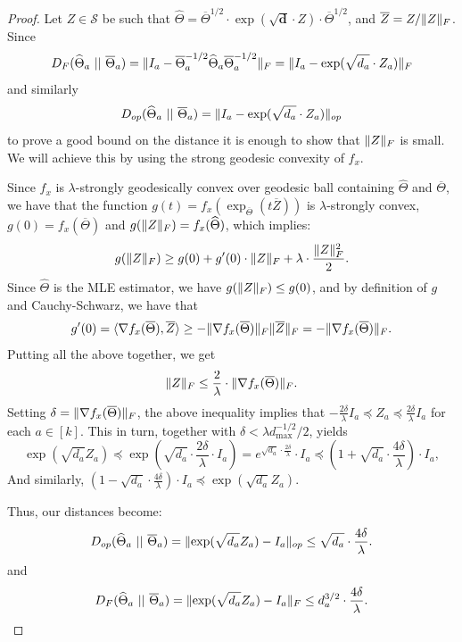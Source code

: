 \documentclass[aos]{imsart}
\theoremstyle{definition}
\numberwithin{equation}{section}
\DeclarePairedDelimiter{\norm}{\lVert}{\rVert}
\newcommand{\otheta}{\overline{\Theta}}
\newcommand{\htheta}{\widehat{\Theta}}
\newcommand{\oZ}{\overline{Z}}
\renewcommand{\vec}{\bm}
\newcommand{\Sym}{\mathcal{S}}
\def\dmax{d_{\max}}
\begin{document}
\begin{proof}
	Let $Z \in \Sym$ be such that $\htheta = \otheta^{1/2} \cdot \exp(\sqrt{\vec d} \cdot Z) \cdot \otheta^{1/2}$, and $\oZ = Z / \norm{Z}_F$.
	Since
	$$ D_F(\htheta_a \ || \ \otheta_a) = \norm{I_a - \otheta_a^{-1/2} \htheta_a \otheta_a^{-1/2}}_F = \norm{I_a - \exp(\sqrt{d_a} \cdot Z_a)}_F $$
	and similarly
	$$ D_{op}(\htheta_a \ || \ \otheta_a) = \norm{I_a - \exp(\sqrt{d_a} \cdot Z_a)}_{op} $$
	to prove a good bound on the distance it is enough to show that $\norm{Z}_F$ is small.
	We will achieve this by using the strong geodesic convexity of $f_x$.

	Since $f_x$ is $\lambda$-strongly geodesically convex over geodesic ball containing $\htheta$ and $\otheta$,	we have that the function $g(t) = f_x(\exp_{\otheta} (t \oZ) )$ is $\lambda$-strongly convex, $g(0) = f_{x}(\otheta)$ and $g(\norm{Z}_F) = f_{x}(\htheta)$, which implies:
	$$ g(\norm{Z}_F) \geq g(0) + g'(0) \cdot \norm{Z}_F + \lambda \cdot \frac{\norm{Z}_F^2}{2}. $$
	Since $\htheta$ is the MLE estimator, we have $g(\norm{Z}_F) \leq g(0)$, and by definition of
	$g$ and Cauchy-Schwarz, we have that
	$$ g'(0) = \langle \nabla f_x(\otheta), \oZ \rangle \geq - \norm{\nabla f_x(\otheta)}_F \norm{\oZ}_F = - \norm{\nabla f_x(\otheta)}_F. $$
	Putting all the above together, we get
	$$ \norm{Z}_F \leq \frac{2}{\lambda} \cdot \norm{\nabla f_x(\otheta)}_F. $$
	Setting $\delta = \norm{\nabla f_x(\otheta)}_F$, the above inequality implies that $- \frac{2\delta}{\lambda} I_a \preceq Z_a \preceq \frac{2\delta}{\lambda} I_a$ for each $a \in [k]$. This in turn, together with $\delta < \lambda \dmax^{-1/2}/2$, yields
	$$ \exp(\sqrt{d_a} Z_a) \preceq \exp\left(\sqrt{d_a} \cdot \frac{2\delta}{\lambda} \cdot I_a \right) 
	= e^{\sqrt{d_a} \cdot \frac{2\delta}{\lambda}} \cdot I_a 
	\preceq \left(  1 + \sqrt{d_a} \cdot \frac{4\delta}{\lambda} \right) \cdot I_a, $$
	And similarly, $\left(  1 - \sqrt{d_a} \cdot \frac{4\delta}{\lambda} \right) \cdot I_a \preceq \exp(\sqrt{d_a} Z_a)$.	
	
	Thus, our distances become:
	$$ D_{op}(\htheta_a \ || \ \otheta_a) =  \norm{\exp(\sqrt{d_a} Z_a) - I_a}_{op} \leq \sqrt{d_a} \cdot \frac{4\delta}{\lambda}. $$
	and 
	$$ D_F(\htheta_a \ || \ \otheta_a) =  \norm{\exp(\sqrt{d_a} Z_a) - I_a}_F \leq d_a^{3/2} \cdot \frac{4\delta}{\lambda}. $$
\end{proof}
\end{document}
